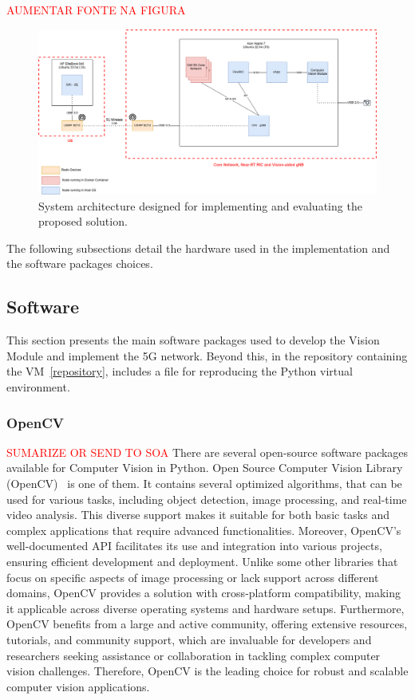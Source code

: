 \textcolor{red}{AUMENTAR FONTE NA FIGURA}
\begin{figure}[H]
    \centering
    \includegraphics[width=0.7\linewidth]{figures/System Arch.drawio}
    \caption[System architecture designed for implementing and evaluating the proposed solution]{System architecture designed for implementing and evaluating the proposed solution.}
    \label{fig:design_arch}
\end{figure}

The following subsections detail the hardware used in the implementation and the software packages choices.


\subsection{Software}\label{subsec:software}
This section presents the main software packages used to develop the Vision Module and implement the 5G network.
Beyond this, in the repository containing the VM~\ref{repository}, includes a file for reproducing the Python virtual environment.

\subsubsection{OpenCV}
\textcolor{red}{SUMARIZE OR SEND TO SOA}
There are several open-source software packages available for Computer Vision in Python.
Open Source Computer Vision Library (OpenCV)~\cite{opencv} is one of them.
It contains several optimized algorithms, that can be used for various tasks, including object detection, image processing, and real-time video analysis.
This diverse support makes it suitable for both basic tasks and complex applications that require advanced functionalities.
Moreover, OpenCV's well-documented API facilitates its use and integration into various projects, ensuring efficient development and deployment.
Unlike some other libraries that focus on specific aspects of image processing or lack support across different domains, OpenCV provides a solution with cross-platform compatibility, making it applicable across diverse operating systems and hardware setups.
Furthermore, OpenCV benefits from a large and active community, offering extensive resources, tutorials, and community support, which are invaluable for developers and researchers seeking assistance or collaboration in tackling complex computer vision challenges.
Therefore, OpenCV is the leading choice for robust and scalable computer vision applications.

